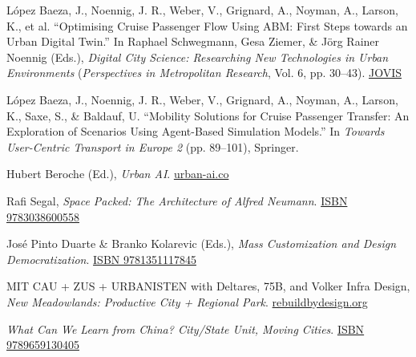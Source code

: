 \begin{tablist}
    \item[2021] \tab
    López Baeza, J., Noennig, J. R., Weber, V., Grignard, A., Noyman, A., Larson, K., et al.
    \enquote{Optimising Cruise Passenger Flow Using ABM: First Steps towards an Urban Digital Twin.}
    In Raphael Schwegmann, Gesa Ziemer, \& Jörg Rainer Noennig (Eds.),
    \textit{Digital City Science: Researching New Technologies in Urban Environments}
    (\textit{Perspectives in Metropolitan Research}, Vol. 6, pp. 30--43).
    \href{https://www.jovis.de/de/buecher/details/product/digital-city-science-researching-new-technologies-in-urban-environments.html}{JOVIS}

    \item[2020] \tab
    López Baeza, J., Noennig, J. R., Weber, V., Grignard, A., Noyman, A., Larson, K., Saxe, S., \& Baldauf, U.
    \enquote{Mobility Solutions for Cruise Passenger Transfer: An Exploration of Scenarios Using Agent-Based Simulation Models.}
    In \textit{Towards User-Centric Transport in Europe 2} (pp. 89--101), Springer.

    \item[2020] \tab
    Hubert Beroche (Ed.), \textit{Urban AI}.
    \href{https://urban-ai.co/wp-content/uploads/2020/06/URBAN-AI-1.pdf}{urban-ai.co}

    \item[2018] \tab
    Rafi Segal, \textit{Space Packed: The Architecture of Alfred Neumann}.
    \href{https://www.amazon.com/Space-Packed-Architecture-Alfred-Neumann/dp/3038600555}{ISBN 9783038600558}

    \item[2018] \tab
    José Pinto Duarte \& Branko Kolarevic (Eds.), \textit{Mass Customization and Design Democratization}.
    \href{https://www.google.com/books/edition/_/Z6h8DwAAQBAJ?hl=en&gbpv=0}{ISBN 9781351117845}

    \item[2015] \tab
    MIT CAU + ZUS + URBANISTEN with Deltares, 75B, and Volker Infra Design, \textit{New Meadowlands: Productive City + Regional Park}.
    \href{http://www.rebuildbydesign.org/our-work/all-proposals/winning-projects/nj-meadowlands}{rebuildbydesign.org}

    \item[2010] \tab
    \textit{What Can We Learn from China? City/State Unit, Moving Cities}.
    \href{https://movingcities.org/movingmemos/the-chinese-city-lecture-workshop/}{ISBN 9789659130405}

\end{tablist}
